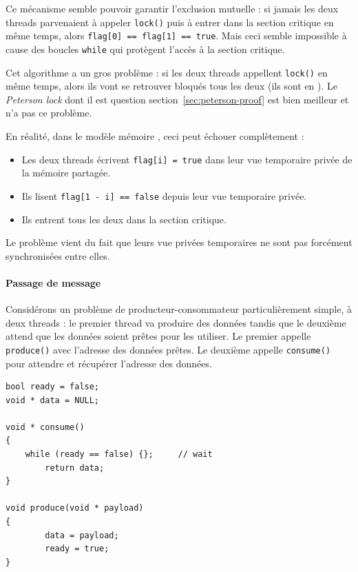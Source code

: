 Ce mécanisme semble pouvoir garantir l'exclusion mutuelle : si jamais
les deux threads parvenaient à appeler \texttt{lock()} puis à entrer
dans la section critique en même temps, alors \texttt{flag[0] == flag[1] == true}.
Mais ceci semble impossible à cause des boucles
\texttt{while} qui protègent l'accès à la section critique.

\begin{danger}
  Cet algorithme a un gros problème : si les deux threads appellent
  \texttt{lock()} en même temps, alors ils vont se retrouver bloqués
  tous les deux (ils sont en ). Le \emph{Peterson
    lock} dont il est question section~\ref{sec:peterson-proof} est
  bien meilleur et n'a pas ce problème.
\end{danger}

En réalité, dans le modèle mémoire \OMP, ceci peut échouer complètement :
\begin{itemize}
\item Les deux threads écrivent \texttt{flag[i] = true} dans leur vue temporaire privée de la mémoire partagée.
\item Ils lisent \texttt{flag[1 - i] == false} depuis leur vue temporaire privée.
\item Ils entrent tous les deux dans la section critique.
\end{itemize}
\medskip

Le problème vient du fait que leurs vue privées temporaires ne sont pas
forcément synchronisées entre elles.

\paragraph{Passage de message} Considérons un problème de \og
producteur-consommateur\fg{} particulièrement simple, à deux threads :
le premier thread va produire des données tandis que le deuxième
attend que les données soient prêtes pour les utiliser. Le premier
appelle \texttt{produce()} avec l'adresse des données prêtes. Le
deuxième appelle \texttt{consume()} pour attendre et récupérer
l'adresse des données.

\begin{myfilet}
\begin{verbatim}
bool ready = false;
void * data = NULL;

void * consume() 
{
	while (ready == false) {};     // wait
        return data; 
}

void produce(void * payload) 
{
        data = payload;
        ready = true;
}
\end{verbatim}
\end{myfilet}

